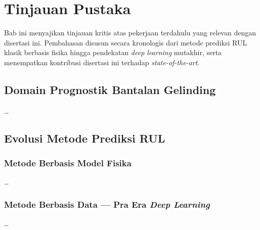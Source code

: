 
\chapter{Tinjauan Pustaka}
\label{bab:tinjauan-pustaka}

Bab ini menyajikan tinjauan kritis atas pekerjaan terdahulu yang
relevan dengan disertasi ini. Pembahasan disusun secara kronologis
dari metode prediksi RUL klasik berbasis fisika hingga pendekatan
\emph{deep learning} mutakhir, serta menempatkan kontribusi disertasi
ini terhadap \emph{state-of-the-art}.

\section{Domain Prognostik Bantalan Gelinding}
\label{subsec:bab2_domain}

\dots

\section{Evolusi Metode Prediksi RUL}
\label{subsec:bab2_evolusi}

\subsection{Metode Berbasis Model Fisika}
\label{subsec:bab2_fisika}

\dots

\subsection{Metode Berbasis Data — Pra Era \emph{Deep Learning}}
\label{subsec:bab2_data_pre_dl}

\dots

